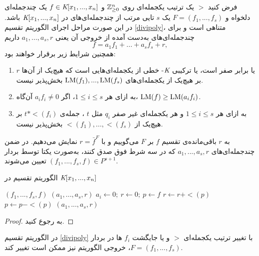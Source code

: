 \begin{theorem}
فرض کنید 
$>$
 یک ترتیب یکجمله‌ای روی 
 $\mathbb{Z}_{\geq 0}^{n}$
 و 
 $f\in\textit{K}[x_{1},...,x_{n}]$
 یک چندجمله‌ای دلخواه و 
 $F = (f_{1},...,f_{s})$
 یک 
 $s$
 تایی مرتب از چندجمله‌ای‌های در 
 $\textit{K}[x_{1},...,x_{n}]$
 باشد. در این صورت مراحل اجرای الگوریتم تقسیم 
 \ref{divipoly}،
  متناهی است و برای چندجمله‌ای‌های به‌دست  آمده از خروجی آن یعنی 
 $a_{1},...,a_{s}, r$
 داریم
 $$f = a_{1}f_{1} + ...+ a_{s}f_{s} + r,$$
همچنین شرایط زیر برقرار خواهند بود:
\begin{enumerate}
\item
 $r$
 یا برابر صفر است، یا ترکیبی 
 $\textit{K}$-
 خطی از یکجمله‌ای‌هایی است که هیچ‌یک از آن‌ها بر هیچ‌یک از یکجمله‌ای‌های 
 $\operatorname{\mathrm{LM}}(f_{1}),...,\operatorname{\mathrm{LM}}(f_{s})$
 بخش‌پذیر نیست.
 \item
به ازای هر 
$1 \leq i\leq s$، 
 اگر 
 $a_{i}f_{i} \neq 0 $
 آن‌گاه،
 $\operatorname{\mathrm{LM}}(f)\geq \operatorname{\mathrm{LM}}(a_{i}f_{i})$.
 \item
 به ازای هر 
 $1\leq i\leq s$
  و هر یکجمله‌ای غیر صفر 
  $q_{i}$
  مثل 
  $t$
  ، جمله‌ی 
  $t*\lt(f_{i})$
  بر هیچ‌یک از 
  $\lt(f_{1}),...,\lt(f_{s})$
  بخش‌پذیر نیست.
\end{enumerate}
 به 
 $r$
 باقی‌مانده‌ی تقسیم 
 $f$
 بر 
 $F$
 می‌گوییم و با 
 $r = \bar{f}^{F}$
 نمایش می‌دهیم. در ضمن چند‌جمله‌ای‌های 
 $a_{1},...,a_{s}, r$
  که در سه شرط فوق صدق کنند، به‌صورت یکتا توسط بردار 
$(f_{1},...,f_{s}, f)\in P^{s+1}$
 تعیین می‌شوند.
\begin{algorithm}[]
	\caption{الگوریتم تقسیم در
		$\textit{K}[x_{1},...,x_{n}]$}
	\label{divipoly}
	\begin{latin}
		\begin{algorithmic}[]		
			\REQUIRE  $(f_{1},...,f_{s}, f)$
			\ENSURE  $(a_{1},...,a_{s}, r)$ 
			\STATE $a_{i}\gets0; \ r\gets 0; \ p\gets f$
			\ELSE
			\ENDIF
			\ENDWHILE
			\STATE $r\gets r + \lt(p)$
			\STATE $p\gets p - \lt(p)$
			\ENDIF
			\ENDWHILE
			\RETURN $(a_{1},...,a_{s}, r)$
		\end{algorithmic}
	\end{latin}
\end{algorithm}
\end{theorem}
\begin{proof}
به 
\cite[ص، ۷۱]{cca1_kreuzer}
رجوع کنید.
\end{proof}
 در الگوریتم تقسیم 
\ref{divipoly}
با تغییر ترتیب یکجمله‌ای 
$>$
و یا جایگشت 
$f_{i}$
ها در بردار
$F = (f_{1},...,f_{s})$،
 خروجی الگوریتم نیز ممکن است تغییر کند.


